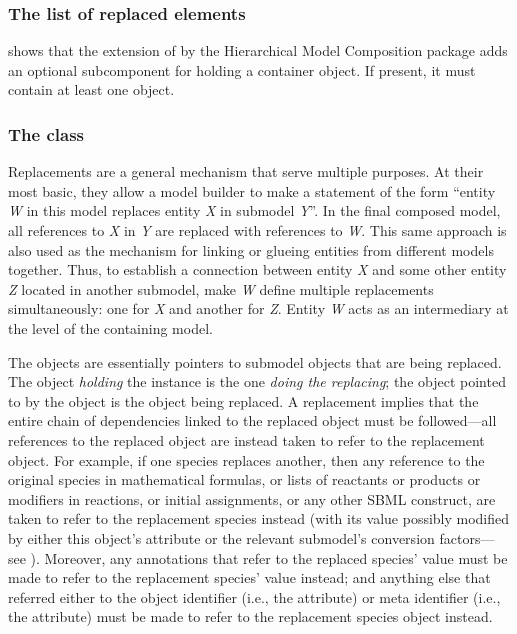 \subsubsection{The list of replaced elements}

 shows that the extension of \SBase by the
Hierarchical Model Composition package adds an optional
 subcomponent for holding a
\ListOfReplacedElements container object.  If present, it must contain
at least one \ReplacedElement object.


\subsubsection{The  class}
\label{replacedelement-class}
\label{listofreplacedelements-class}

Replacements are a general mechanism that serve multiple purposes.  At
their most basic, they allow a model builder to make a statement of the
form ``entity \emph{W} in this model replaces entity \emph{X} in
submodel \emph{Y}''.  In the final composed model, all references to
\emph{X} in \emph{Y} are replaced with references to \emph{W}.  This
same approach is also used as the mechanism for linking or glueing
entities from different models together.  Thus, to establish a
connection between entity \emph{X} and some other entity \emph{Z}
located in another submodel, make \emph{W} define multiple replacements
simultaneously: one for \emph{X} and another for \emph{Z}.  Entity
\emph{W} acts as an intermediary at the level of the containing model.

The \ReplacedElement objects are essentially pointers to submodel
objects that are being replaced.  The object \emph{holding} the
\ReplacedElement instance is the one \emph{doing the replacing}; the
object pointed to by the \ReplacedElement object is the object being
replaced.  A replacement implies that the entire chain of dependencies
linked to the replaced object must be followed---all references to the
replaced object are instead taken to refer to the replacement object.
For example, if one species replaces another, then any reference to the
original species in mathematical formulas, or lists of reactants or
products or modifiers in reactions, or initial assignments, or any other
SBML construct, are taken to refer to the replacement species instead
(with its value possibly modified by either this object's
 attribute or the relevant submodel's conversion
factors---see ).  Moreover, any annotations
that refer to the replaced species'  value must be made to
refer to the replacement species'  value instead; and
anything else that referred either to the object identifier (i.e., the
 attribute) or meta identifier (i.e., the 
attribute) must be made to refer to the replacement species object
instead.  

